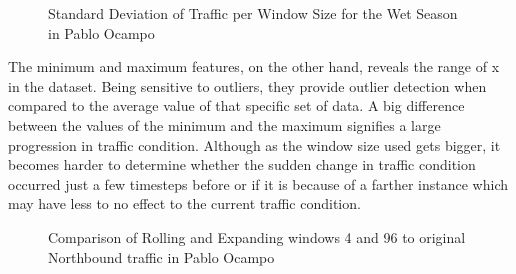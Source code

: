 \begin{figure}[h] 
\centering
  \centering
  \caption{Standard Deviation of Traffic per Window Size for the Wet Season in Pablo Ocampo}
  \label{stDev}
\end{figure}


The minimum and maximum features, on the other hand, reveals the range of x in the dataset. Being sensitive to outliers, they provide outlier detection when compared to the average value of that specific set of data. A big difference between the values of the minimum and the maximum signifies a large progression in traffic condition. Although as the window size used gets bigger, it becomes harder to determine whether the sudden change in traffic condition occurred just a few timesteps before or if it is because of a farther instance which may have less to no effect to the current traffic condition. 

\begin{figure}[h] 
\centering
    \centering
      \captionsetup{justification=centering}
    \hfill
    \caption{Comparison of Rolling and Expanding windows 4 and 96 to original Northbound traffic in Pablo Ocampo}
\end{figure}

